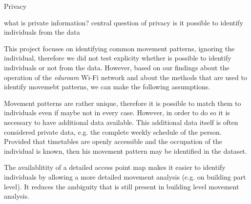 Privacy

what is private information?
central question of privacy
is it possible to identify individuals from the data

This project focuses on identifying common movement patterns, ignoring
the individual, therefore we did not test explicity whether is possible to
identify individuals or not from the data. However, based on our findings about
the operation of the \textit{eduroam} Wi-Fi network and about the methods that
are used to identify movemebt patterns, we can make the following assumptions.

Movement patterns are rather unique, therefore it is possible to match them to
individuals even if maybe not in every case. However, in order to do so it is
necessary to have additional data available. This additional data itself is
often considered private data, e.g. the complete weekly schedule of the person.
Provided that timetables are openly accessible and the occupation of the
individual is known, then his movement pattern may be identified in the dataset.

The availablitity of a detailed access point map makes it easier to identify
individuals by allowing a more detailed movement analysis (e.g. on building part
level). It reduces the ambiguity that is still present in building level
movement analysis.


